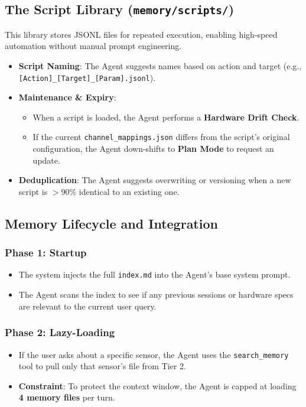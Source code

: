 \documentclass[conference]{IEEEtran}
\begin{document}
\subsection{The Script Library (\texttt{memory/scripts/})}
This library stores JSONL files for repeated execution, enabling high-speed automation without manual prompt engineering.
\begin{itemize}
    \item \textbf{Script Naming}: The Agent suggests names based on action and target (e.g., \texttt{[Action]\_[Target]\_[Param].jsonl}).
    \item \textbf{Maintenance \& Expiry}:
    \begin{itemize}
        \item When a script is loaded, the Agent performs a \textbf{Hardware Drift Check}.
        \item If the current \texttt{channel\_mappings.json} differs from the script's original configuration, the Agent down-shifts to \textbf{Plan Mode} to request an update.
    \end{itemize}
    \item \textbf{Deduplication}: The Agent suggests overwriting or versioning when a new script is $>$90\% identical to an existing one.
\end{itemize}

\subsection{Memory Lifecycle and Integration}
\subsubsection{Phase 1: Startup}
\begin{itemize}
    \item The system injects the full \texttt{index.md} into the Agent's base system prompt.
    \item The Agent scans the index to see if any previous sessions or hardware specs are relevant to the current user query.
\end{itemize}
\subsubsection{Phase 2: Lazy-Loading}
\begin{itemize}
    \item If the user asks about a specific sensor, the Agent uses the \texttt{search\_memory} tool to pull only that sensor's file from Tier 2.
    \item \textbf{Constraint}: To protect the context window, the Agent is capped at loading \textbf{4 memory files} per turn.
\end{itemize}
\end{document}
